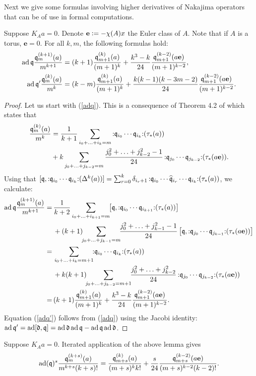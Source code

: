 Next we give some formulas involving higher derivatives of Nakajima operators that can be of use in formal computations.
\begin{proposition}
Suppose $K_Aa=0$. 
Denote $\mathbf e\vcentcolon= -\chi(A)x$ the Euler class of $A$.
Note that if $A$ is a torus, $\mathbf e=0$. 
For all $k,m$, the following formulas hold:
\begin{align}
\label{adq}
\operatorname{ad} \mathfrak{q}  \frac{\mathfrak{q}_m^{(k+1)}(a)}{m^{k+1}} & = (k+1)  \frac{\mathfrak{q}_{m+1}^{(k)}(a)}{(m+1)^{k}} + \frac{k^3-k}{24}\frac{\mathfrak{q}_{m+1}^{(k-2)}(a\mathbf e)}{(m+1)^{k-2}} , \\
\label{adq'}
\operatorname{ad} \mathfrak{q}' \frac{\mathfrak{q}_m^{(k)}(a)}{m^k} & = (k-m) \frac{\mathfrak{q}_{m+1}^{(k)}(a)}{(m+1)^k}+ \frac{k(k-1)(k-3m-2)}{24}\frac{\mathfrak{q}_{m+1}^{(k-2)}(a\mathbf e)}{(m+1)^{k-2}} .
\end{align}
\end{proposition}
\begin{proof}
Let us start with (\ref{adq}). This is a consequence of Theorem 4.2 of \cite{LiQinWang2} which states that 
\begin{align*}
\frac{\mathfrak{q}_m^{(k)}(a)}{m^k}
& = \frac{1}{k+1}\sum_{i_0+\ldots+i_k=m} \mathop{:}\nolimits\! \mathfrak{q}_{i_0}\cdots \mathfrak{q}_{i_k} \!\mathop{:}\nolimits  (\tau_*(a)) \\
& +  k \sum_{j_0+\ldots+j_{k-2}=m} \frac{j_0^2+\ldots+j_{k-2}^2-1}{24}\mathop{:}\nolimits\! \mathfrak{q}_{j_0}\cdots \mathfrak{q}_{j_{k-2}} \!\mathop{:}\nolimits  (\tau_*(a\mathbf e)) .
\end{align*}
Using that 
$[\mathfrak{q},\mathop{:}\nolimits\! \mathfrak{q}_{i_0}\cdots \mathfrak{q}_{i_k} \!\mathop{:}\nolimits  (\Delta^k(a)) ] = \sum_{r=0}^k \delta_{i_r+1} \mathop{:}\nolimits\!\mathfrak{q}_{i_0}\cdots \widehat{\mathfrak{q}}_{i_r} \cdots \mathfrak{q}_{i_k} \!\mathop{:}\nolimits (\tau_*(a))$, 
we calculate:
\begin{align*}
\ad\q \frac{\q_m^{(k+1)}(a)}{m^{k+1}} 
  =\, &\frac{1}{k+2}\sum_{i_0+\ldots+i_{k+1}=m}\!\! \left[\q,\nor \q_{i_0}\cdots \q_{i_{k+1}} \mal (\tau_*(a))\right] \\
 & + (k+1)\!\! \sum_{j_0+\ldots+j_{k-1}=m}\!\! \frac{j_0^2+\ldots+j_{k-1}^2-1}{24}\left[\q,\nor \q_{j_0}\cdots \q_{j_{k-1}} \mal (\tau_*(a\mathbf e)) \right]\\
  =\, & \sum_{i_0+\ldots+i_{k}=m+1} \!\!\nor \q_{i_0}\cdots \q_{i_{k}} \mal  (\tau_*(a)) \\
 & + k(k+1)\!\! \sum_{j_0+\ldots+j_{k-2}=m+1}\!\! \frac{j_0^2+\ldots+j_{k-2}^2}{24}\nor \q_{j_0}\cdots \q_{j_{k-2}} \mal (\tau_*(a\mathbf e)) \\
  =\, & (k+1)  \frac{\q_{m+1}^{(k)}(a)}{(m+1)^{k}} + \frac{k^3-k}{24}\frac{\q_{m+1}^{(k-2)}(a\mathbf e)}{(m+1)^{k-2}}.
\end{align*}
Equation (\ref{adq'}) follows from (\ref{adq}) using the Jacobi identity: $\operatorname{ad} \mathfrak{q}' = \operatorname{ad} [\mathfrak d,\mathfrak{q}] = \operatorname{ad} \mathfrak d  \operatorname{ad} \mathfrak{q} - \operatorname{ad} \mathfrak{q}\operatorname{ad} \mathfrak d  $.
\end{proof}
\begin{corollary} \label{adqCorollary}
Suppose $K_Aa=0$.
Iterated application of the above lemma gives
 \begin{equation}
 \operatorname{ad}(\mathfrak{q})^s \frac{\mathfrak{q}_{m}^{(k+s)}(a)}{m^{k+s}(k+s)!} =\frac{\mathfrak{q}_{m+s}^{(k)}(a)}{(m+s)^kk!} + \frac{s}{24}\frac{\mathfrak{q}_{m+s}^{(k-2)}(a\mathbf e)}{(m+s)^{k-2}(k-2)!}.
\end{equation}
\end{corollary}


